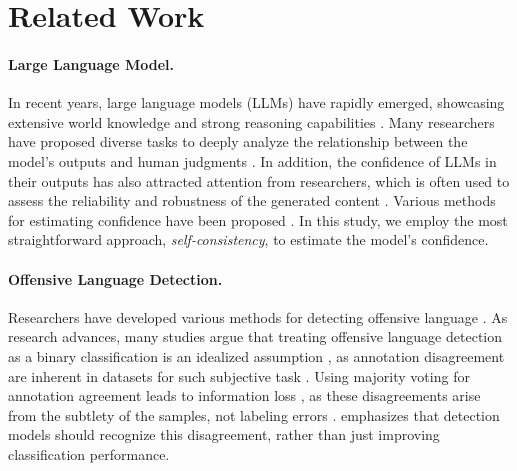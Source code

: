 \section{Related Work}
\paragraph{Large Language Model.}
In recent years, large language models (LLMs) have rapidly emerged, showcasing extensive world knowledge and strong reasoning capabilities \cite{DBLP:conf/nips/KojimaGRMI22, DBLP:conf/nips/Ouyang0JAWMZASR22, DBLP:journals/corr/abs-2303-08774}. 
Many researchers have proposed diverse tasks to deeply analyze the relationship between the model's outputs and human judgments \cite{DBLP:journals/corr/abs-2408-01419, DBLP:journals/corr/abs-2404-05264}.
In addition, the confidence of LLMs in their outputs has also attracted attention from researchers, which is often used to assess the reliability and robustness of the generated content \cite{DBLP:journals/tacl/JiangADN21}.
Various methods for estimating confidence have been proposed \cite{DBLP:conf/icml/ZhangKH20, DBLP:conf/iclr/0002WSLCNCZ23, DBLP:conf/emnlp/TianMZSRYFM23, DBLP:journals/tmlr/LinHE22}. 
In this study, we employ the most straightforward approach, \textit{self-consistency}, to estimate the model’s confidence.


\paragraph{Offensive Language Detection.}
Researchers have developed various methods for detecting offensive language \cite{DBLP:conf/icwsm/FountaDCLBSVSK18, DBLP:conf/icwsm/DavidsonWMW17, DBLP:conf/aaai/MathewSYBG021}.
As research advances, many studies argue that treating offensive language detection as a binary classification is an idealized assumption \cite{basile-etal-2021-need, DBLP:conf/aiia/Basile20, plank-2022-problem}, as annotation disagreement are inherent in datasets for such subjective task \cite{DBLP:journals/tacl/PavlickK19, DBLP:journals/jair/UmaFHPPP21}. 
Using majority voting for annotation agreement leads to information loss \cite{DBLP:journals/tacl/DavaniDP22}, as these disagreements arise from the subtlety of the samples, not labeling errors \cite{DBLP:journals/frai/UmaAP22}. 
\citet{DBLP:conf/semeval/LeonardelliAABF23} emphasizes that detection models should recognize this disagreement, rather than just improving classification performance.


